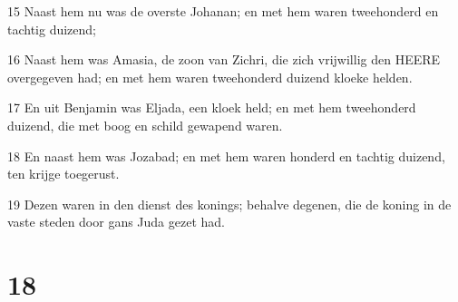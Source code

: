 \par 15 Naast hem nu was de overste Johanan; en met hem waren tweehonderd en tachtig duizend;
\par 16 Naast hem was Amasia, de zoon van Zichri, die zich vrijwillig den HEERE overgegeven had; en met hem waren tweehonderd duizend kloeke helden.
\par 17 En uit Benjamin was Eljada, een kloek held; en met hem tweehonderd duizend, die met boog en schild gewapend waren.
\par 18 En naast hem was Jozabad; en met hem waren honderd en tachtig duizend, ten krijge toegerust.
\par 19 Dezen waren in den dienst des konings; behalve degenen, die de koning in de vaste steden door gans Juda gezet had.

\chapter{18}

